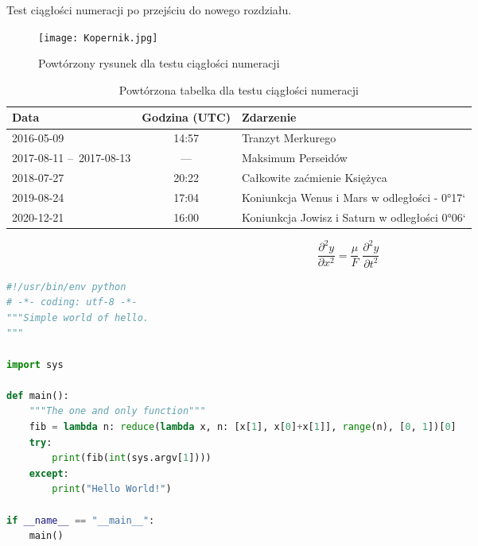 Test ciągłości numeracji po przejściu do nowego rozdziału.


\begin{figure}[!hb]
	\centering \texttt{[image: Kopernik.jpg]}
	\caption{Powtórzony rysunek dla testu ciągłości numeracji}
	\label{rys:kopernik2}
\end{figure}

\begin{table}[!b]
 \centering
  \begin{tabular}{p{2.5cm}c|l}
    Data        &   Godzina (UTC)   &   Zdarzenie\\\hline
    2016-05-09  &   14:57           &   Tranzyt Merkurego\\\hline
    2017-08-11 --~2017-08-13  & --- &   Maksimum Perseidów \\\hline
    2018-07-27  &   20:22           &   Całkowite zaćmienie Księżyca\\\hline
    2019-08-24  &   17:04           &   Koniunkcja Wenus i Mars w odległości - 0°17`\\\hline
    2020-12-21  &   16:00           &   Koniunkcja Jowisz i Saturn w odległości 0°06`
  \end{tabular}
 \caption{\label{tab:zjawiska2}Powtórzona tabelka dla testu ciągłości numeracji}
\end{table}

\begin{equation}
    \frac{\partial^2 y}{\partial x^2} = \frac{\mu}{F} \; \frac{\partial^2 y}{\partial t^2}
\end{equation}

\begin{lstlisting}[language=Python,
    caption={Powtórzony kod dla testu ciągłości numeracji},
    label={lst:hello2}]
#!/usr/bin/env python
# -*- coding: utf-8 -*-
"""Simple world of hello.
"""

import sys

def main():
    """The one and only function"""
    fib = lambda n: reduce(lambda x, n: [x[1], x[0]+x[1]], range(n), [0, 1])[0]
    try:
        print(fib(int(sys.argv[1])))
    except:
        print("Hello World!")

if __name__ == "__main__":
    main()
\end{lstlisting}


